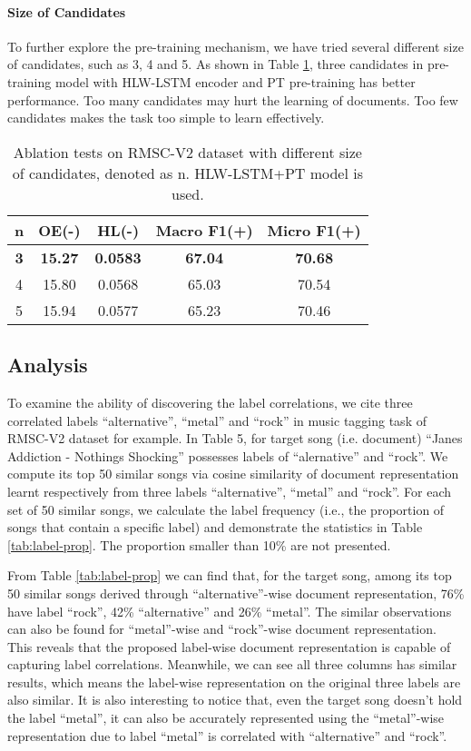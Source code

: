 \documentclass[runningheads]{llncs}
\begin{document}
\paragraph{Size of Candidates} To further explore the pre-training mechanism, we have tried several different size of candidates, such as 3, 4 and 5. As shown in Table \ref{tab:num}, three candidates in pre-training model with HLW-LSTM encoder and PT pre-training has better performance. Too many candidates may hurt the learning of documents. Too few candidates makes the task too simple to learn effectively.
\begin{table}
    \centering
    \setlength{\abovecaptionskip}{0.3cm}
    \begin{tabular}{c|cccc}
        \hline
        \textbf{n} & \textbf{OE(-)} & \textbf{HL(-)} & \textbf{Macro F1(+)} & \textbf{Micro F1(+)} \\ \hline
        \textbf{3} & \textbf{15.27} & \textbf{0.0583} & \textbf{67.04} & \textbf{70.68}\\
        4 & 15.80 & 0.0568 & 65.03 & 70.54 \\
        5 & 15.94 & 0.0577 & 65.23 & 70.46 \\
        \hline
    \end{tabular}
    \caption{Ablation tests on RMSC-V2 dataset with different size of candidates, denoted as n. HLW-LSTM+PT model is used.}
    \label{tab:num}
\end{table}

\subsection{Analysis}
To examine the ability of discovering the label correlations, we cite three correlated labels ``alternative'', ``metal'' and ``rock'' in music tagging task of RMSC-V2 dataset for example. In Table 5, for target song (i.e. document) ``Janes Addiction - Nothings Shocking'' possesses labels of ``alernative'' and ``rock''. We compute its top 50 similar songs via cosine similarity of document representation learnt respectively from three labels ``alternative'', ``metal'' and ``rock''. For each set of 50 similar songs, we calculate the label frequency (i.e., the proportion of songs that contain a specific label) and demonstrate the statistics in Table \ref{tab:label-prop}. The proportion smaller than 10\% are not presented.

From Table \ref{tab:label-prop} we can find that, for the target song, among its top 50 similar songs derived through ``alternative''-wise document representation, 76\% have label ``rock'', 42\% ``alternative'' and 26\% ``metal''. The similar observations can also be found for ``metal''-wise and ``rock''-wise document representation. This reveals that the proposed label-wise document representation is capable of capturing label correlations. Meanwhile, we can see all three columns has similar results, which means the label-wise representation on the original three labels are also similar. It is also interesting to notice that, even the target song doesn't hold the label ``metal'', it can also be accurately represented using the ``metal''-wise representation due to label ``metal'' is correlated with ``alternative'' and ``rock''. 
\end{document}
